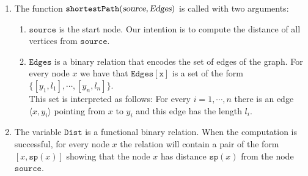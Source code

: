 \noindent
\begin{enumerate}
\item The function $\mathtt{shortestPath}(\textsl{source}, \textsl{Edges})$ is called with two arguments:
      \begin{enumerate}
      \item $\mathtt{source}$ is the start node.  Our intention is to compute the distance of all
            vertices from $\mathtt{source}$.
      \item $\mathtt{Edges}$ is a binary relation that encodes the set of edges of the graph.  For
            every node $x$ we have that $\mathtt{Edges}[\mathtt{x}]$ is a set of the form
            \\[0.2cm]
            \hspace*{1.3cm}
            $\{ [y_1, l_1], \cdots, [y_n, l_n] \}$.
            \\[0.2cm]
            This set is interpreted as follows: For every $i = 1,\cdots,n$ there is an edge
            $\langle x, y_i \rangle$ pointing from $x$ to $y_i$ and this edge has the length $l_i$.
      \end{enumerate}
\item The variable $\mathtt{Dist}$ is a functional binary relation.  When the computation is
      successful, for every node $x$ the relation will contain a pair of the form
      $[x, \mathtt{sp}(x)]$ showing that the node $x$ has distance $\mathtt{sp}(x)$ from the node $\mathtt{source}$.


\end{enumerate}

